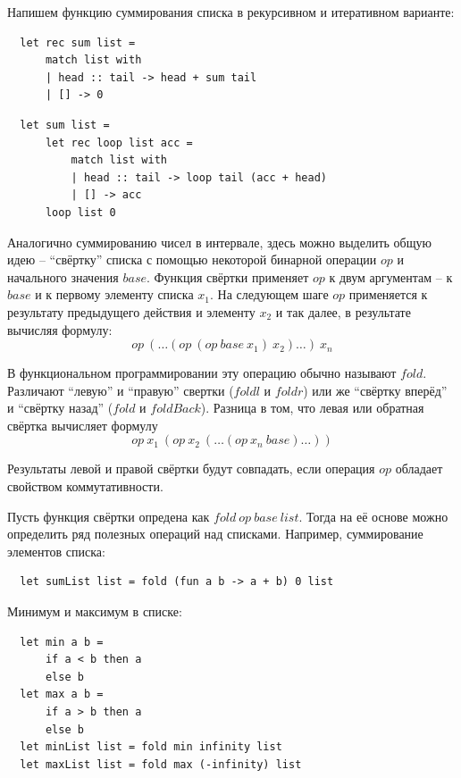 \documentclass[a4paper,11pt]{article}
\begin{document}
Напишем функцию суммирования списка в рекурсивном и итеративном варианте:
\begin{lstlisting}
  let rec sum list =
      match list with
      | head :: tail -> head + sum tail
      | [] -> 0  
\end{lstlisting}

\begin{lstlisting}
  let sum list =
      let rec loop list acc =
          match list with
          | head :: tail -> loop tail (acc + head)
          | [] -> acc
      loop list 0
\end{lstlisting}

Аналогично суммированию чисел в интервале, здесь можно выделить общую идею -- 
``свёртку'' списка с помощью некоторой бинарной операции $op$ и начального 
значения $base$. Функция свёртки применяет $op$ к двум аргументам -- к $base$ и
к первому элементу списка $x_1$. На следующем шаге $op$ применяется к результату
предыдущего действия и элементу $x_2$ и так далее, в результате вычисляя формулу:
\begin{equation*}
  op~(\ldots (op~(op~base~x_1)~x_2) \ldots)~x_n
\end{equation*}

В функциональном программировании эту операцию обычно называют $fold$. Различают
``левую'' и ``правую'' свертки ($foldl$ и $foldr$) или же ``свёртку вперёд'' и
``свёртку назад'' ($fold$ и $foldBack$). Разница в том, что левая или обратная
свёртка вычисляет формулу
\begin{equation*}
  op~x_1~(op~x_2~(\ldots (op~x_n~base) \ldots))
\end{equation*}

Результаты левой и правой свёртки будут совпадать, если операция $op$ обладает
свойством коммутативности.

Пусть функция свёртки опредена как $fold~op~base~list$. Тогда на её основе можно
определить ряд полезных операций над списками. Например, суммирование элементов
списка:
\begin{lstlisting}
  let sumList list = fold (fun a b -> a + b) 0 list
\end{lstlisting}

Минимум и максимум в списке:
\begin{lstlisting}
  let min a b = 
      if a < b then a
      else b
  let max a b = 
      if a > b then a
      else b
  let minList list = fold min infinity list
  let maxList list = fold max (-infinity) list
\end{lstlisting}
\end{document}
